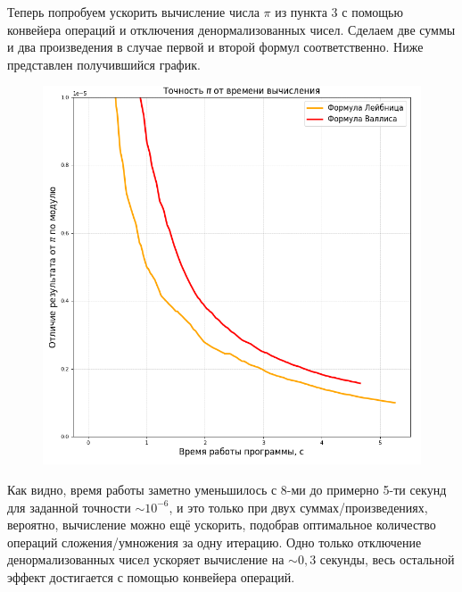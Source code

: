 \documentclass[a4paper,12pt]{article}
\begin{document}
Теперь попробуем ускорить вычисление числа $\pi$ из пункта 3 с помощью конвейера операций и отключения денормализованных чисел. Сделаем две суммы и два произведения в случае первой и второй формул соответственно. Ниже представлен получившийся график.
\begin{figure}[H]\label{fig: Pi_1and2_Accuracy(time)_optimized}
    \centering
    \includegraphics[width = \textwidth]{Pi_1and2_Accuracy(time)_optimized.png}
\end{figure}
Как видно, время работы заметно уменьшилось с 8-ми до примерно 5-ти секунд для заданной точности $\sim 10^{-6}$, и это только при двух суммах/произведениях, вероятно, вычисление можно ещё ускорить, подобрав оптимальное количество операций сложения/умножения за одну итерацию. Одно только отключение денормализованных чисел ускоряет вычисление на $\sim 0,3$ секунды, весь остальной эффект достигается с помощью конвейера операций. 
\end{document}
